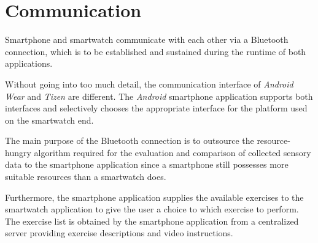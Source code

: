 \section{Communication}
Smartphone and smartwatch communicate with each other via a Bluetooth connection, which is to be established and sustained during the runtime of both applications.

Without going into too much detail, the communication interface of \textit{Android Wear} and \textit{Tizen} are different. The \textit{Android} smartphone application supports both interfaces and selectively chooses the appropriate interface for the platform used on the smartwatch end.

The main purpose of the Bluetooth connection is to outsource the resource-hungry algorithm required for the evaluation and comparison of collected sensory data to the smartphone application since a smartphone still possesses more suitable resources than a smartwatch does.

Furthermore, the smartphone application supplies the available exercises to the smartwatch application to give the user a choice to which exercise to perform. The exercise list is obtained by the smartphone application from a centralized server providing exercise descriptions and video instructions.